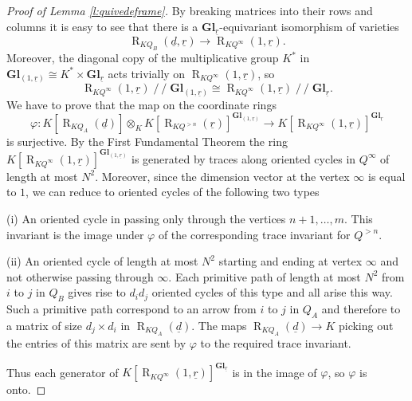 \documentclass[11pt,a4paper]{amsart}
\theoremstyle{plain}
\theoremstyle{definition}
\begin{document}
\begin{proof}[Proof of  Lemma \ref{l:quivedeframe}]
By breaking matrices into their rows and columns it is easy to see that there is a ${\mathbf{Gl}_{\underline{r}}}$-equivariant isomorphism of varieties
\[ 
{\operatorname{R}_{KQ_B}(\underline{d},\underline{r})} \to {\operatorname{R}_{KQ^{\infty}}(1,\underline{r})}.
\]
Moreover, the diagonal copy of the multiplicative group $K^*$ in 
${\mathbf{Gl}}_{(1,{\underline{r}})} \cong K^* \times {\mathbf{Gl}}_{\underline{r}}$ acts trivially on ${\operatorname{R}_{KQ^{\infty}}(1,\underline{r})}$,
so 
\[
{\operatorname{R}_{KQ^{\infty}}(1,\underline{r})} \operatorname{/\!\!/} {\mathbf{Gl}}_{(1, {\underline{r}})}\cong {\operatorname{R}_{KQ^{\infty}}(1,\underline{r})} \operatorname{/\!\!/} {\mathbf{Gl}_{\underline{r}}}.
\]
We have to prove that the map on the coordinate rings 
\[ 
\varphi\colon K[ {\operatorname{R}_{KQ_A}(\underline{d})} ]\otimes_K K[ {\operatorname{R}_{KQ^{>n}}(\underline{r})} ]^{{\mathbf{Gl}}_{(1, {\underline{r}} )}} \to K[{\operatorname{R}_{KQ^{\infty}}(1,\underline{r})} ]^{\mathbf{Gl}_{\underline{r}}}
\]
is surjective. By the First Fundamental Theorem \cite{LP} the ring $K[{\operatorname{R}_{KQ^{\infty}}(1,\underline{r})} ]^{{\mathbf{Gl}}_{(1, {\underline{r}} )}}$ is generated by traces along oriented cycles in $Q^\infty$ of length at most $N^2$. Moreover, since the dimension vector at the vertex $\infty $ is equal to $1$, we can reduce to oriented cycles of 
the following two types 

(i) An oriented cycle in passing only through the vertices $n+ 1, \ldots , m$. This invariant is the image under $\varphi $ of the corresponding trace invariant for $Q^{>n}$.  

(ii) An oriented cycle of length at most $N^2$ starting and ending at vertex $\infty $ and not otherwise passing through $\infty $. Each primitive path of length at most $N^2$ from $i$ to $j$ in 
$Q_B$ gives rise to $d_i d_j$ oriented cycles of this type and all arise this way. 
Such a primitive path correspond to an arrow from $i$ to $j$ in $Q_A$ and therefore to a matrix of size $d_j \times d_i$ in ${\operatorname{R}_{KQ_A}(\underline{d})}$. The maps ${\operatorname{R}_{KQ_A}(\underline{d})}\to K$ 
picking out the entries of this matrix are sent by $\varphi $ to the required trace invariant. 

Thus each generator of $K[{\operatorname{R}_{KQ^{\infty}}(1,\underline{r})} ]^{\mathbf{Gl}_{\underline{r}}}$ is in the image of $\varphi$, so $\varphi$ is onto.
\end{proof}
\end{document}
